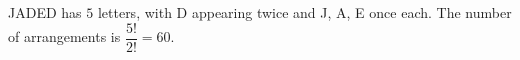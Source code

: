 JADED has $5$ letters, with D appearing twice and J, A, E once each. The number of arrangements is $\dfrac{5!}{2!}=\boxed{60}$.
